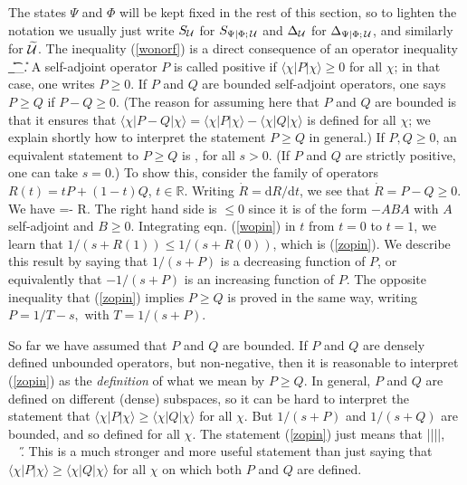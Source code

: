 \documentclass[12pt]{article}
\def\Bbb{\mathbb}
\def\ra{\rangle}
\def\la{\langle}
\def\R{{\Bbb{R}}}\def\Z{{\Bbb{Z}}}
\numberwithin{equation}{section}
\def\d{\mathrm d}
\def\Z{{\Bbb Z}}
\begin{document}
The states $\Psi$ and $\Phi$ will be kept fixed in the rest of this section, so to lighten the notation we usually just write $S_{\mathcal U}$ for $S_{\Psi|\Phi;\,{\mathcal U}}$ and $\Delta_{\mathcal U}$
for $\Delta_{\Psi|\Phi;\,{\mathcal U}}$, and similarly for $\t \U$.  The inequality (\ref{wonorf}) is a direct consequence of an operator inequality
\be\label{opin} \Delta_{\t \U}\geq \Delta_\U. \ee
A self-adjoint operator $P$ is called positive if $\la\chi|P|\chi\ra\geq 0$ for all $\chi$; in that case, one writes $P\geq 0$.
 If $P$ and $Q$ are bounded self-adjoint
operators, one says $P\geq Q$ if $P-Q\geq 0$.    (The reason for assuming here that $P$ and $Q$ are bounded is that it ensures
that $\la\chi|P-Q|\chi\ra=\la\chi|P|\chi\ra -\la\chi|Q|\chi\ra$ is defined for all $\chi$; we explain shortly how to interpret
the statement $P\geq Q$ in general.)
  If $P,Q\geq 0$,
an equivalent statement to $P\geq Q$ is
\be\label{zopin}\leq {}, \ee
for all $s>0$.      
 (If $P$ and $Q$ are strictly positive, one can take $s=0$.)  To show this, consider the family of operators $R(t)=tP+(1-t)Q$,
 $t\in\R$.  Writing $\dot R=\d R/\d t$, we  see that $\dot R=P-Q\geq 0$.
We have
\be\label{wopin}\frac{\d}{\d t}=- \dot R.\ee
The right hand side is $\leq 0$ since it is of the form $-ABA$ with $A$ self-adjoint and $B\geq 0$.
Integrating eqn. (\ref{wopin}) in $t$ from $t=0$ to $t=1$, we learn that  $1/(s+R(1))\leq 1/(s+R(0))$, which is (\ref{zopin}).    We describe this result by saying that $1/(s+P)$ is a decreasing function of $P$, or equivalently that $-1/(s+P)$ is an increasing function of $P$.     The opposite inequality that (\ref{zopin}) implies $P\geq Q$ is proved in the same way, writing
$P=1/T-s,$ with $T=1/(s+P)$. 

So far we have assumed that $P$ and $Q$ are bounded.
If $P$ and $Q$ are  densely defined unbounded operators, but non-negative, then it is reasonable to interpret (\ref{zopin}) as the {\it definition} of what we mean by $P\geq Q$.  In general, $P$ and $Q$ are defined on 
different (dense) subspaces, so it can be hard to interpret the statement that $\la\chi |P|\chi\ra\geq\la\chi|Q|\chi\ra$ for all $\chi$. But $1/(s+P)$ and $1/(s+Q)$ are bounded, and so defined for all $\chi$.  The statement (\ref{zopin}) just means that
\be\label{polm}\left\la\chi\left|\right|\chi\right\ra\leq\left\la \chi\left|\right|\chi\right\ra, ~~\forall \chi\in\H.\ee
This is a much stronger and more useful statement than just saying that  $\la\chi |P|\chi\ra\geq\la\chi|Q|\chi\ra$ for all $\chi$ on which
both $P$ and $Q$ are defined.
\end{document}
